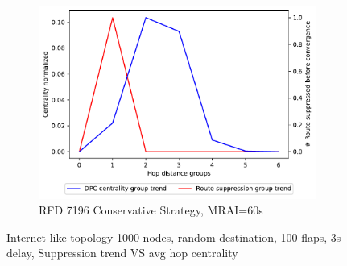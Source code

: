 \begin{figure}[H]
\begin{subfigure}[b]{0.325\textwidth}
         \label{fig:1000_7196RFDA_centVSsup_elephants}
     \end{subfigure}
     \hfill
     \begin{subfigure}[b]{0.325\textwidth}
         \centering
         \includegraphics[width=\textwidth]{images/RFD/miceVSelephants/MultiMRAI/60/elephants/cisco_1000_RFD_7196_conservative_nodeConvergence_centVSsup_trend.pdf}
         \caption{RFD 7196 Conservative Strategy, MRAI=60s}
         \label{fig:1000_7196RFDC_centVSsup_elephants}
     \end{subfigure}
        \caption{Internet like topology 1000 nodes, random destination, 100 flaps, 3s delay, Suppression trend VS avg hop centrality}
        \label{fig:1000_RFD_centVSsup_elephants}
\end{figure}
